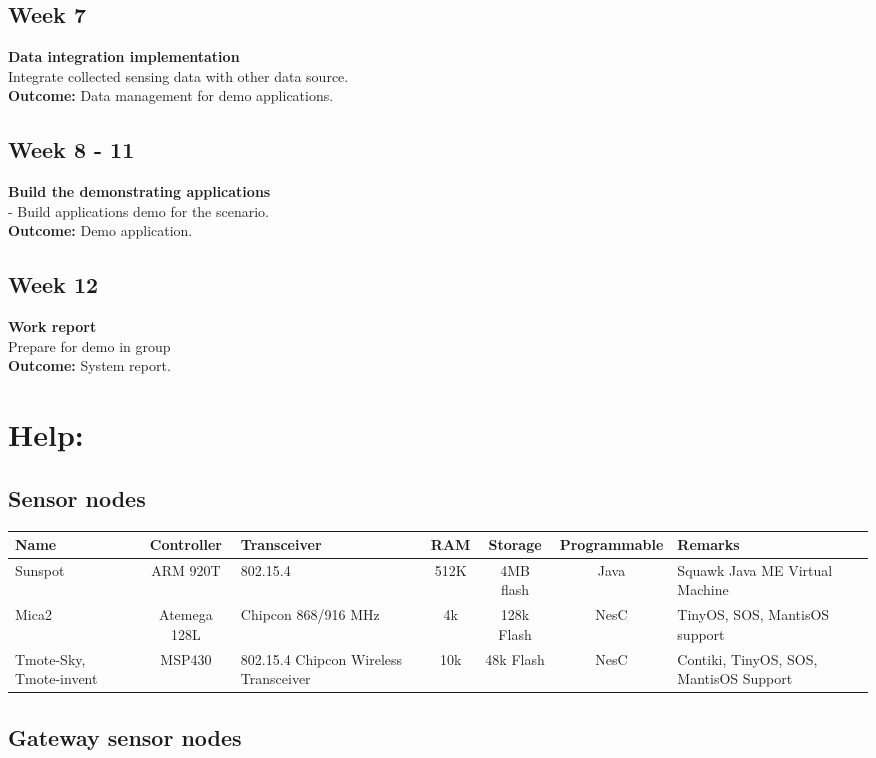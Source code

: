 \documentclass[a4paper]{llncs}
\newcommand{\head}[1]{\textnormal {\textbf{#1}}}
\begin{document}
\subsection{Week 7}
\head{Data integration implementation}\\
Integrate collected sensing data with other data source.\\
\head{Outcome: } Data management for demo applications.
\subsection{Week 8 - 11}
\head{Build the demonstrating applications}\\
- Build applications demo for the scenario.\\
\head{Outcome: }  Demo application.
\subsection{Week 12}
\head{Work report}\\
Prepare for demo in group\\
\head{Outcome: } System report.

\section{Help:}

\subsection{Sensor nodes}
\begin{tabular}{|p{2.5cm}|c|p{2cm}|c|c|c|p{2.5cm}|}
\hline
\head{Name} & \head{Controller} & \head{Transceiver} & \head{RAM} & \head{Storage} &\head{Programmable} &\head{Remarks}\\
\hline
{Sunspot} & {ARM 920T} & {802.15.4} & {512K} & {4MB flash} & {Java } & {Squawk Java ME Virtual Machine} \\
\hline
{Mica2} & {Atemega 128L} & {Chipcon 868/916 MHz}& {4k} & {128k Flash} & {NesC} & {TinyOS, SOS, MantisOS support} \\
\hline
{Tmote-Sky, Tmote-invent} & {MSP430} & {802.15.4 Chipcon Wireless Transceiver} & {10k} & {48k Flash} & {NesC} & {Contiki, TinyOS, SOS, MantisOS Support}\\
\hline
\end{tabular}

\subsection{Gateway sensor nodes}
\end{document}
